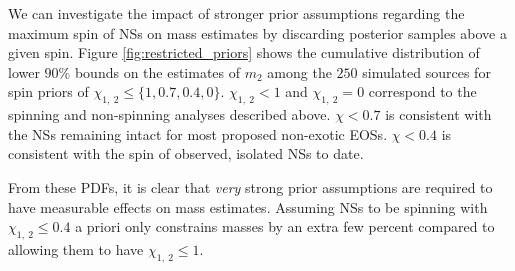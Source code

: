 We can investigate the impact of stronger prior assumptions regarding the maximum spin of NSs on mass estimates by discarding posterior samples above a given spin.  Figure \ref{fig:restricted_priors} shows the cumulative distribution of lower $90\%$ bounds on the estimates of $m_2$ among the $250$ simulated sources for spin priors of $\chi_{1,~2} \leq \{1, 0.7, 0.4, 0\}$.  $\chi_{1,~2}<1$ and $\chi_{1,~2}=0$ correspond to the spinning and non-spinning analyses described above.  $\chi<0.7$ is consistent with the NSs remaining intact for most proposed non-exotic EOSs.  $\chi<0.4$ is consistent with the spin of observed, isolated NSs to date.

From these PDFs, it is clear that \textit{very} strong prior assumptions are required to have measurable effects on mass estimates. Assuming NSs to be spinning with $\chi_{1,~2}\leq 0.4$ a priori only constrains masses by an extra few percent compared to allowing them to have $\chi_{1,~2} \leq 1$.
  
  
  
  